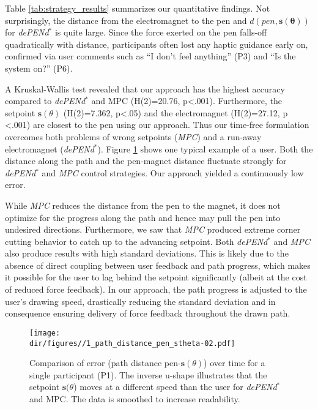Table \ref{tab:strategy_results} summarizes our quantitative findings. 
Not surprisingly, the distance from the electromagnet to the pen and  $d(pen, \mathbf{s(\theta)})$ for \emph{dePENd$^{*}$} is quite large. 
Since the force exerted on the pen falls-off quadratically with distance, participants often lost any haptic guidance early on, confirmed via user comments such as ``I don't feel anything'' (P3) and ``Is the system on?'' (P6). 

A Kruskal-Wallis test revealed that our approach has the highest accuracy compared to \emph{dePENd$^{*}$} and MPC (H(2)=20.76, p<.001).
Furthermore, the setpoint $\mathbf{s}(\theta)$ (H(2)=7.362, p<.05) and the electromagnet (H(2)=27.12, p <.001) are closest to the pen using our approach. 
Thus our time-free formulation overcomes both problems of wrong setpoints (\emph{MPC}) and a run-away electromagnet (\emph{dePENd$^{*}$}).
 Figure \ref{fig:single_user_control} shows one typical example of a user. 
 Both the distance along the path and the pen-magnet distance fluctuate strongly for \emph{dePENd$^{*}$} and  \emph{MPC} control strategies.
 Our approach yielded a continuously low error.

While \emph{MPC} reduces the distance from the pen to the magnet, it does not optimize for the progress along the path and hence may pull the pen into undesired directions. 
Furthermore, we saw that \emph{MPC} produced extreme corner cutting behavior to catch up to the advancing setpoint.
Both \emph{dePENd$^{*}$} and \emph{MPC} also produce results with high standard deviations.
This is likely due to the absence of direct coupling between user feedback and path progress, which makes it possible for the user to lag behind the setpoint significantly (albeit at the cost of reduced force feedback). 
In our approach, the path progress is adjusted to the user's drawing speed, drastically reducing the standard deviation and in consequence ensuring delivery of force feedback throughout the drawn path. 
 
\begin{figure}[!t]%
	\centering
    \texttt{[image: \\dir/figures//1\_path\_distance\_pen\_stheta-02.pdf]}%
    \caption{Comparison of error (path distance pen-$\mathbf{s}(\theta)$) over time for a single participant (P1). The inverse u-shape illustrates that the setpoint $\mathbf{s}(\theta$) moves at a different speed than the user for \emph{dePENd$^{*}$} and MPC. The data is smoothed to increase readability.} 
    \label{fig:single_user_control}
    \vspace{-1em}
\end{figure}

